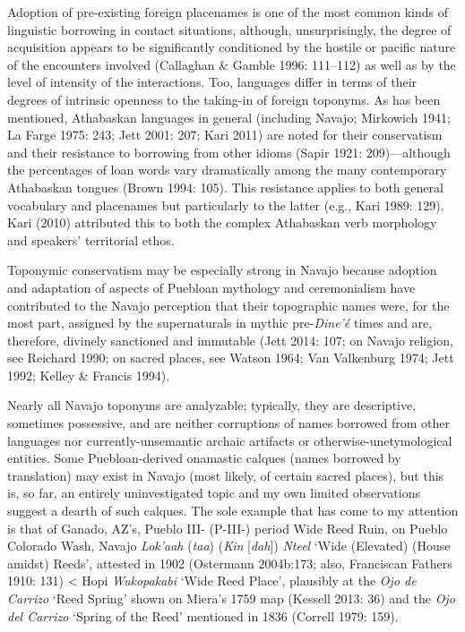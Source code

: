 Adoption of pre-existing foreign placenames is one of the most common kinds of linguistic borrowing in contact situations, although, unsurprisingly, the degree of acquisition appears to be significantly conditioned by the hostile or pacific nature of the encounters involved (Callaghan \& Gamble 1996: 111–112) as well as by the level of intensity of the interactions.  Too, languages differ in terms of their degrees of intrinsic openness to the taking-in of foreign toponyms.  As has been mentioned, Athabaskan languages in general (including Navajo; Mirkowich 1941; La Farge 1975: 243; Jett 2001: 207; Kari 2011) are noted for their conservatism and their resistance to borrowing from other idioms (Sapir 1921: 209)---although the percentages of loan words vary dramatically among the many contemporary Athabaskan tongues (Brown 1994: 105).  This resistance applies to both general vocabulary and placenames but particularly to the latter (e.g., Kari 1989: 129).  Kari (2010) attributed this to both the complex Athabaskan verb morphology and speakers’ territorial ethos.

Toponymic conservatism may be especially strong in Navajo because adoption and adaptation of aspects of Puebloan mythology and ceremonialism have contributed to the Navajo perception that their topographic names were, for the most part, assigned by the supernaturals in mythic pre-\textit{Dine’é }times and are, therefore, divinely sanctioned and immutable (Jett 2014: 107; on Navajo religion, see Reichard 1990; on sacred places, see Watson 1964; Van Valkenburg 1974; Jett 1992; Kelley \& Francis 1994).

Nearly all Navajo toponyms are analyzable; typically, they are descriptive, sometimes possessive, and are neither corruptions of names borrowed from other languages nor currently-unsemantic archaic artifacts or otherwise-unetymological entities.  Some Puebloan-derived onamastic calques (names borrowed by translation) may exist in Navajo (most likely, of certain sacred places), but this is, so far, an entirely uninvestigated topic and my own limited observations suggest a dearth of such calques.  The sole example that has come to my attention is that of Ganado, AZ’s, Pueblo III- (P-III-) period Wide Reed Ruin, on Pueblo Colorado Wash, Navajo \textit{Lok’aah} (\textit{taa}) (\textit{Kin} [\textit{dah}])\textit{ Nteel} ‘Wide (Elevated) (House amidst) Reeds’, attested in 1902 (Ostermann 2004b:173; also, Franciscan Fathers 1910: 131) {\textless} Hopi \textit{Wukopakabi} ‘Wide Reed Place’, plausibly at the \textit{Ojo de Carrizo} ‘Reed Spring’ shown on Miera’s 1759 map (Kessell 2013: 36) and the \textit{Ojo del Carrizo} ‘Spring of the Reed’ mentioned in 1836 (Correll 1979: 159).

